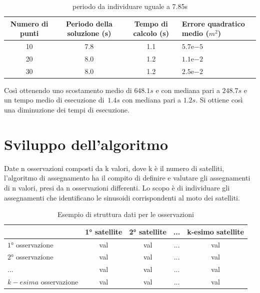 \documentclass[a4paper,12pt]{report}
\newcommand{\expnumber}[2]{{#1}\mathrm{e}{#2}}
\begin{document}
\begin{itemize}
      \begin{table}[H]
        \caption{periodo da individuare uguale a 7.85s}
        \begin{center}
          \label{tab:limiteInf_2}
          \begin{tabularx}{\textwidth}{SSSp{0.5\textwidth}}
            \toprule
            {Numero di punti} & {Periodo della soluzione (s)} & {Tempo di calcolo (s)} & {Errore quadratico \newline medio ($m^2$)}\\
            \midrule
            10 &  7.8  & 1.1 & $\expnumber{5.7}{-5}$\\
            20 &  8.0 & 1.2 & $\expnumber{1.1}{-2}$\\
            30 &  8.0 & 1.2 & $\expnumber{2.5}{-2}$\\
            \bottomrule
          \end{tabularx}
        \end{center}
      \end{table}
\end{itemize}

Così ottenendo uno scostamento medio di $648.1s$ e con mediana pari a $248.7s$ e un tempo medio di esecuzione di~$1.4s$ con mediana pari a $1.2s$.
Si ottiene così una diminuzione dei tempi di esecuzione.

\chapter{Sviluppo dell'algoritmo}
Date n osservazioni composti da k valori, dove k è il numero di satelliti, l'algoritmo di assegnamento ha il compito di definire e valutare gli assegnamenti di n valori, presi da n osservazioni differenti. Lo scopo è di individuare gli assegnamenti che identificano le sinusoidi corrispondenti al moto dei satelliti.

\begin{table}[H]
  \caption{Esempio di struttura dati per le osservazioni}
  \label{tab:osservazioni}
  \center
    \begin{tabular}{lcccc}
      \toprule
      {} & {\ang{1} satellite} & {\ang{2} satellite} & {...} & {k-esimo satellite}\\
      \midrule
      $\ang{1}$ osservazione & val & val & ... & val \\
      $\ang{2}$ osservazione & val & val & ... & val  \\
      ...                    & val & val & ... & val \\
      $k-esima$ osservazione & val & val & ... & val \\
      \bottomrule
    \end{tabular}
\end{table}
\end{document}
